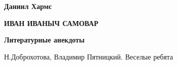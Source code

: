 \documentclass[12pt]{article}
\begin{document}
    \begin{center}
        {\Huge\bf Даниил Хармс}

        \vspace{1cm}

        {\bf ИВАН ИВАНЫЧ САМОВАР}
    \end{center}

    {}
    
    \newpage 

    \begin{center}
        {\Huge\bf Литературные анекдоты}

        \vspace{1cm}

        Н.Доброхотова, Владимир Пятницкий. Веселые ребята
    \end{center}

    
\end{document}
